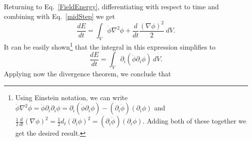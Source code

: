 \documentclass[nofootinbib,twocolumn]{revtex4}
\begin{document}
Returning to Eq.~\eqref{FieldEnergy}, differentiating with respect to time and combining with Eq.~\eqref{midStep} we get
\begin{equation}
    \frac{dE}{dt} = \int_V \Dot{\phi}\nabla^2\phi + \frac{d}{dt} \frac{(\nabla\phi)^2}{2} \: dV.
    \label{integralhard}
\end{equation}
It can be easily shown\footnote{Using Einstein notation, we can write $\Dot{\phi}\nabla^2\phi = \Dot{\phi}\partial_i\partial_i\phi =\partial_i\left( \Dot{\phi}\partial_i\phi\right)-(\partial_i\Dot{\phi})(\partial_i\phi)$ and $\frac{1}{2}\frac{d}{dt}(\nabla\phi)^2 = \frac{1}{2}d_t\left( \partial_i\phi\right)^2 =(\partial_i\Dot{\phi})(\partial_i\phi)$. Adding both of these together we get the desired result.} that the integral in this expression simplifies to
\begin{equation}
    \frac{dE}{dt} = \int_V \partial_i\left( \Dot{\phi}\partial_i\phi \right) \: dV.
    \label{integraleasy}
\end{equation}
Applying now the divergence theorem, we conclude that
\end{document}
